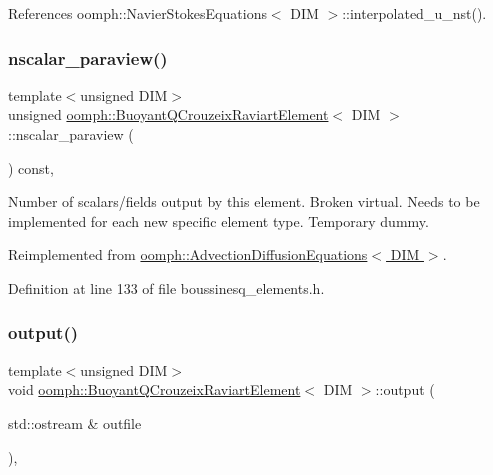 References oomph\+::\+Navier\+Stokes\+Equations$<$ D\+I\+M $>$\+::interpolated\+\_\+u\+\_\+nst().

\mbox{\label{classoomph_1_1BuoyantQCrouzeixRaviartElement_a5103e49416e1a0e36a2e8e117fb78623}} 
\subsubsection{\texorpdfstring{nscalar\+\_\+paraview()}{nscalar\_paraview()}}
{\footnotesize\ttfamily template$<$unsigned D\+IM$>$ \\
unsigned \hyperlink{classoomph_1_1BuoyantQCrouzeixRaviartElement}{oomph\+::\+Buoyant\+Q\+Crouzeix\+Raviart\+Element}$<$ D\+IM $>$\+::nscalar\+\_\+paraview (\begin{DoxyParamCaption}{ }\end{DoxyParamCaption}) const\hspace{0.3cm}{\ttfamily [inline]}, {\ttfamily [virtual]}}



Number of scalars/fields output by this element. Broken virtual. Needs to be implemented for each new specific element type. Temporary dummy. 



Reimplemented from \hyperlink{classoomph_1_1AdvectionDiffusionEquations_a70205e9d39d7ff9660a53402d5636c1f}{oomph\+::\+Advection\+Diffusion\+Equations$<$ D\+I\+M $>$}.



Definition at line 133 of file boussinesq\+\_\+elements.\+h.

\mbox{\label{classoomph_1_1BuoyantQCrouzeixRaviartElement_a3817706dbf3c755b4029917dac80bad7}} 
\subsubsection{\texorpdfstring{output()}{output()}\hspace{0.1cm}{\footnotesize\ttfamily [1/4]}}
{\footnotesize\ttfamily template$<$unsigned D\+IM$>$ \\
void \hyperlink{classoomph_1_1BuoyantQCrouzeixRaviartElement}{oomph\+::\+Buoyant\+Q\+Crouzeix\+Raviart\+Element}$<$ D\+IM $>$\+::output (\begin{DoxyParamCaption}\item[{std\+::ostream \&}]{outfile }\end{DoxyParamCaption})\hspace{0.3cm}{\ttfamily [inline]}, {\ttfamily [virtual]}}



